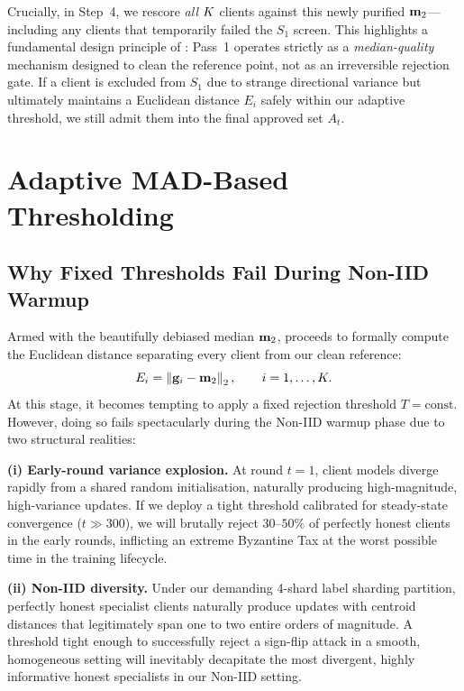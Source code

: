 \documentclass[../main.tex]{subfiles}
\begin{document}
Crucially, in Step~4, we rescore \emph{all} $K$ clients against this newly purified $\mathbf{m}_{2}$---including any clients that temporarily failed the $S_1$ screen. This highlights a fundamental design principle of \aegis{}: Pass~1 operates strictly as a \emph{median-quality} mechanism designed to clean the reference point, not as an irreversible rejection gate. If a client is excluded from $S_1$ due to strange directional variance but ultimately maintains a Euclidean distance $E_i$ safely within our adaptive threshold, we still admit them into the final approved set $A_t$.

\section{Adaptive MAD-Based Thresholding}
\label{sec:aegis_threshold}

\subsection{Why Fixed Thresholds Fail During Non-IID Warmup}
\label{sec:aegis_fixed_thresh_failure}

Armed with the beautifully debiased median $\mathbf{m}_{2}$, \aegis{} proceeds to formally compute the Euclidean distance separating every client from our clean reference:
\begin{equation}
    E_i = \left\|\mathbf{g}_{i} - \mathbf{m}_{2}\right\|_2, \qquad i = 1, \ldots, K.
    \label{eq:euclidean_distance}
\end{equation}
At this stage, it becomes tempting to apply a fixed rejection threshold $T = \text{const}$. However, doing so fails spectacularly during the Non-IID warmup phase due to two structural realities:

\textbf{(i) Early-round variance explosion.} At round $t = 1$, client models diverge rapidly from a shared random initialisation, naturally producing high-magnitude, high-variance updates. If we deploy a tight threshold calibrated for steady-state convergence ($t \gg 300$), we will brutally reject $30$--$50\%$ of perfectly honest clients in the early rounds, inflicting an extreme Byzantine Tax at the worst possible time in the training lifecycle.

\textbf{(ii) Non-IID diversity.} Under our demanding 4-shard label sharding partition, perfectly honest specialist clients naturally produce updates with centroid distances that legitimately span one to two entire orders of magnitude. A threshold tight enough to successfully reject a sign-flip attack in a smooth, homogeneous setting will inevitably decapitate the most divergent, highly informative honest specialists in our Non-IID setting.
\end{document}
